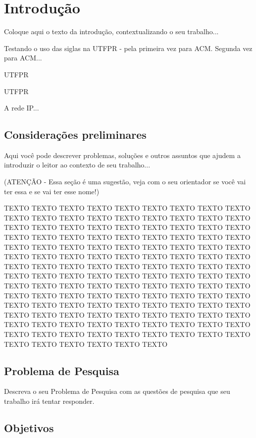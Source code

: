 \chapter{Introdução}
\label{cap:introducao}

Coloque aqui o texto da introdução, contextualizando o seu trabalho...

Testando o uso das siglas na \gls{UTFPR} - pela primeira vez para \gls{ACM}. Segunda vez para \gls{ACM}...

\gls{UTFPR}

\acrlong{UTFPR}

A rede \gls{IP}...

\section{Considerações preliminares}

Aqui você pode descrever problemas, soluções e outros assuntos que ajudem a introduzir o leitor ao contexto de seu trabalho...

(ATENÇÃO - Essa seção é uma sugestão, veja com o seu orientador se você vai ter essa e se vai ter esse nome!)

TEXTO TEXTO TEXTO TEXTO TEXTO TEXTO TEXTO TEXTO TEXTO TEXTO TEXTO TEXTO TEXTO TEXTO TEXTO TEXTO TEXTO TEXTO TEXTO TEXTO TEXTO TEXTO TEXTO TEXTO TEXTO TEXTO TEXTO TEXTO TEXTO TEXTO TEXTO TEXTO TEXTO TEXTO TEXTO TEXTO TEXTO TEXTO TEXTO TEXTO TEXTO TEXTO TEXTO TEXTO TEXTO TEXTO TEXTO TEXTO TEXTO TEXTO TEXTO TEXTO TEXTO TEXTO TEXTO TEXTO TEXTO TEXTO TEXTO TEXTO TEXTO TEXTO TEXTO TEXTO TEXTO TEXTO TEXTO TEXTO TEXTO TEXTO TEXTO TEXTO TEXTO TEXTO TEXTO TEXTO TEXTO TEXTO TEXTO TEXTO TEXTO TEXTO TEXTO TEXTO TEXTO TEXTO TEXTO TEXTO TEXTO TEXTO TEXTO TEXTO TEXTO TEXTO TEXTO TEXTO TEXTO TEXTO TEXTO TEXTO TEXTO TEXTO TEXTO TEXTO TEXTO TEXTO TEXTO TEXTO TEXTO TEXTO TEXTO TEXTO TEXTO TEXTO TEXTO TEXTO TEXTO TEXTO TEXTO TEXTO TEXTO TEXTO TEXTO TEXTO TEXTO TEXTO TEXTO TEXTO TEXTO TEXTO TEXTO TEXTO

\section{Problema de Pesquisa}
\label{cap:introducao:sec:problema:pesquisa}

Descreva o seu Problema de Pesquisa com as questões de pesquisa que seu trabalho irá tentar responder.

\section{Objetivos}
\label{cap:introducao:sec:objetivos}

